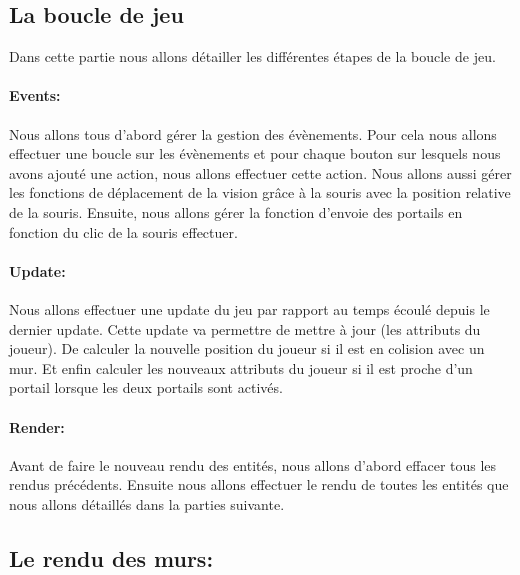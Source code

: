 \documentclass[11pt]{article}
\begin{document}
\subsection{La boucle de jeu}
Dans cette partie nous allons détailler les différentes étapes de la boucle de jeu.

\paragraph{Events:}
Nous allons tous d'abord gérer la gestion des évènements. Pour cela nous allons effectuer une boucle sur les évènements et pour chaque bouton sur lesquels nous avons ajouté une action, nous allons effectuer cette action. Nous allons aussi gérer les fonctions de déplacement de la vision grâce à la souris avec la position relative de la souris. Ensuite, nous allons gérer la fonction d'envoie des portails en fonction du clic de la souris effectuer.

\paragraph{Update:}
Nous allons effectuer une update du jeu par rapport au temps écoulé depuis le dernier update. Cette update va permettre de mettre à jour (les attributs du joueur). De calculer la nouvelle position du joueur si il est en colision avec un mur. Et enfin calculer les nouveaux attributs du joueur si il est proche d'un portail lorsque les deux portails sont activés.

\paragraph{Render:}
Avant de faire le nouveau rendu des entités, nous allons d'abord effacer tous les rendus précédents. Ensuite nous allons effectuer le rendu de toutes les entités que nous allons détaillés dans la parties suivante.



\subsection{Le rendu des murs:}
\end{document}
